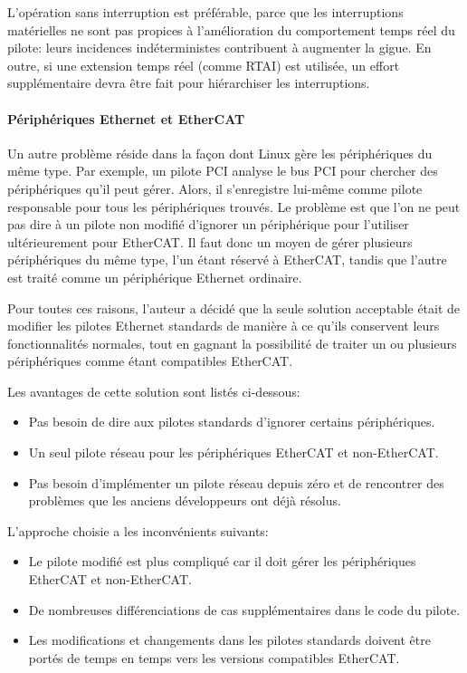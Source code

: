 \documentclass[a4paper,12pt,BCOR6mm,bibtotoc,idxtotoc]{scrbook}
\begin{document}
L'op\'eration sans interruption est pr\'ef\'erable, parce que les
interruptions mat\'erielles ne sont pas propices \`a l'am\'elioration
du comportement temps r\'eel du pilote: leurs incidences
ind\'eterministes contribuent \`a augmenter la gigue. En outre, si une
extension temps r\'eel (comme RTAI) est utilis\'ee, un effort
suppl\'ementaire devra \^etre fait pour hi\'erarchiser les
interruptions.

\paragraph{P\'eriph\'eriques Ethernet et EtherCAT}
Un autre probl\`eme r\'eside dans la fa\c{c}on dont Linux g\`ere les
p\'eriph\'eriques du m\^eme type.  Par exemple, un pilote
PCI analyse le bus PCI pour chercher des p\'eriph\'eriques
qu'il peut g\'erer.  Alors, il s'enregistre lui-m\^eme comme pilote
responsable pour tous les p\'eriph\'eriques trouv\'es.  Le probl\`eme
est que l'on ne peut pas dire \`a un pilote non modifi\'e d'ignorer un
p\'eriph\'erique pour l'utiliser ult\'erieurement pour EtherCAT. Il
faut donc un moyen de g\'erer plusieurs p\'eriph\'eriques du m\^eme
type, l'un \'etant r\'eserv\'e \`a EtherCAT, tandis que l'autre est
trait\'e comme un p\'eriph\'erique Ethernet ordinaire.

Pour toutes ces raisons, l'auteur a d\'ecid\'e que la seule solution
acceptable \'etait de modifier les pilotes Ethernet standards de
mani\`ere \`a ce qu'ils conservent leurs fonctionnalit\'es normales,
tout en gagnant la possibilit\'e de traiter un ou plusieurs
p\'eriph\'eriques comme \'etant compatibles EtherCAT.

Les avantages de cette solution sont list\'es ci-dessous:

\begin{itemize}
\item Pas besoin de dire aux pilotes standards d'ignorer certains
  p\'eriph\'eriques.
\item Un seul pilote r\'eseau pour les p\'eriph\'eriques EtherCAT et
  non-EtherCAT.
\item Pas besoin d'impl\'ementer un pilote r\'eseau depuis z\'ero et
  de rencontrer des probl\`emes que les anciens d\'eveloppeurs ont
  d\'ej\`a r\'esolus.
\end{itemize}

L'approche choisie a les inconv\'enients suivants:

\begin{itemize}
\item Le pilote modifi\'e est plus compliqu\'e car il doit g\'erer les
  p\'eriph\'eriques EtherCAT et non-EtherCAT.
\item De nombreuses diff\'erenciations de cas suppl\'ementaires dans le
  code du pilote.
\item Les modifications et changements dans les pilotes standards
  doivent \^etre port\'es de temps en temps vers les versions compatibles
  EtherCAT.
\end{itemize}
\end{document}
